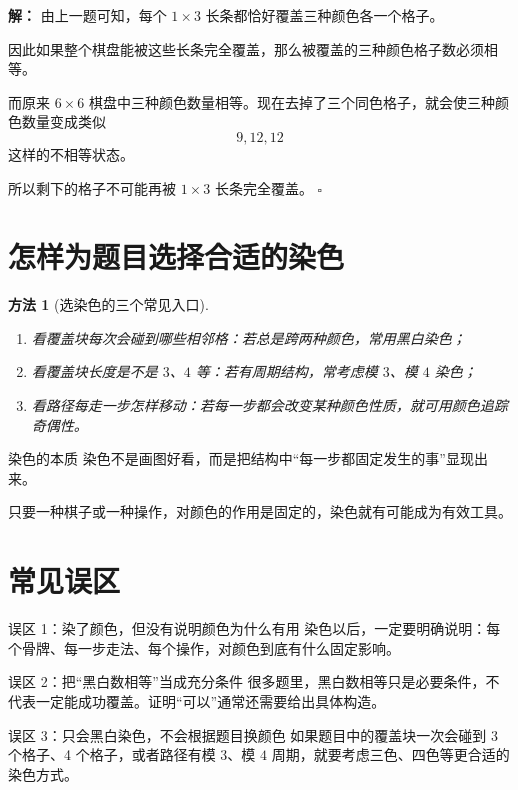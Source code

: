 \documentclass[11pt,a4paper,fontset=fandol]{ctexart}
\theoremstyle{formaltheorem}
\newtheorem{method}{方法}[section]
\theoremstyle{formalexample}
\newenvironment{solution}{\par\noindent\textbf{解：}}{\hfill$\square$\par}
\begin{document}
\begin{solution}
由上一题可知，每个 $1\times 3$ 长条都恰好覆盖三种颜色各一个格子。

因此如果整个棋盘能被这些长条完全覆盖，那么被覆盖的三种颜色格子数必须相等。

而原来 $6\times 6$ 棋盘中三种颜色数量相等。现在去掉了三个同色格子，就会使三种颜色数量变成类似
\[
9,12,12
\]
这样的不相等状态。

所以剩下的格子不可能再被 $1\times 3$ 长条完全覆盖。
\end{solution}

\section{怎样为题目选择合适的染色}

\begin{method}[选染色的三个常见入口]
\begin{enumerate}
  \item 看覆盖块每次会碰到哪些相邻格：若总是跨两种颜色，常用黑白染色；
  \item 看覆盖块长度是不是 $3$、$4$ 等：若有周期结构，常考虑模 $3$、模 $4$ 染色；
  \item 看路径每走一步怎样移动：若每一步都会改变某种颜色性质，就可用颜色追踪奇偶性。
\end{enumerate}
\end{method}

\begin{notebox}{染色的本质}
染色不是画图好看，而是把结构中“每一步都固定发生的事”显现出来。

只要一种棋子或一种操作，对颜色的作用是固定的，染色就有可能成为有效工具。
\end{notebox}

\section{常见误区}

\begin{notebox}{误区 1：染了颜色，但没有说明颜色为什么有用}
染色以后，一定要明确说明：每个骨牌、每一步走法、每个操作，对颜色到底有什么固定影响。
\end{notebox}

\begin{notebox}{误区 2：把“黑白数相等”当成充分条件}
很多题里，黑白数相等只是必要条件，不代表一定能成功覆盖。证明“可以”通常还需要给出具体构造。
\end{notebox}

\begin{notebox}{误区 3：只会黑白染色，不会根据题目换颜色}
如果题目中的覆盖块一次会碰到 3 个格子、4 个格子，或者路径有模 $3$、模 $4$ 周期，就要考虑三色、四色等更合适的染色方式。
\end{notebox}
\end{document}
